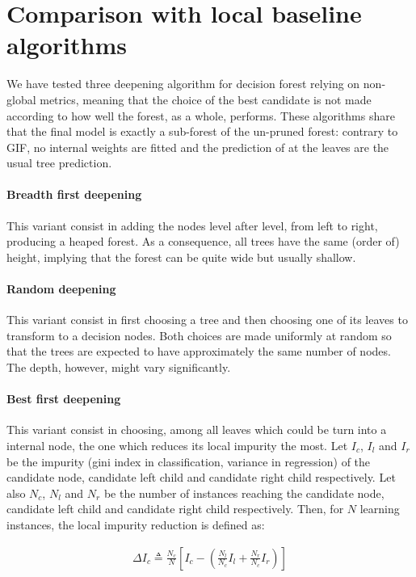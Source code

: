 \documentclass{article}
\begin{document}
\section{Comparison with local baseline algorithms}
We have tested three deepening algorithm for decision forest relying on 
non-global metrics, meaning that the choice of the best candidate is not made 
according to how well the forest, as a whole, performs. These algorithms share 
that the final model is exactly a sub-forest of the un-pruned forest: contrary 
to GIF, no internal weights are fitted and the prediction of at the leaves are 
the usual tree prediction.

\paragraph{Breadth first deepening}
This variant consist in adding the nodes level after level, from left to right, 
producing a heaped forest. As a consequence, all trees have the same (order of) 
height, implying that the forest can be quite wide but usually shallow.

\paragraph{Random deepening}
This variant consist in first choosing a tree and then choosing one of its 
leaves to transform to a decision nodes. Both choices are made uniformly at 
random so that the trees are expected to have approximately the same number of 
nodes. The depth, however, might vary significantly.

\paragraph{Best first deepening}
This variant consist in choosing, among all leaves which could be turn into a 
internal node, the one which reduces its local impurity the most. Let $I_c$, 
$I_l$ and $I_r$ be the impurity (gini index in classification, variance in 
regression) of the candidate node, candidate left child and candidate right 
child respectively. Let also $N_c$, $N_l$ and $N_r$ be the number of instances 
reaching the candidate node, candidate left child and candidate right child 
respectively. Then, for $N$ learning instances, the local impurity reduction is 
defined as:

\begin{align}
\Delta I_c \triangleq \frac{N_c}{N} \left[ I_c - \left( \frac{N_l}{N_c} I_l + 
\frac{N_r}{N_c} I_r \right)\right]
\end{align}
\end{document}
